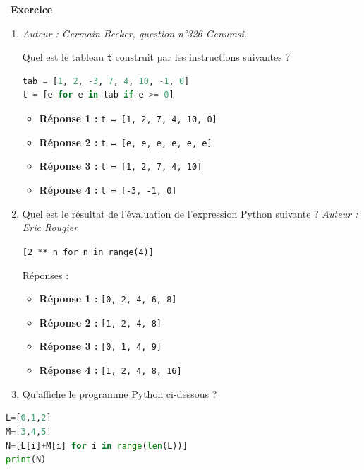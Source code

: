\documentclass[
  11pt,
]{article}
\newcommand{\passthrough}[1]{#1}
\providecommand{\tightlist}{%
  \setlength{\itemsep}{0pt}\setlength{\parskip}{0pt}}
\newcounter{exo}
\newenvironment{exercice}[1]
{\par \medskip   \addtocounter{exo}{1} \noindent  
\begin{bclogo}[arrondi =0.1,   noborder = true, logo=\bccrayon, marge=4]{~\textbf{Exercice} \textbf{\theexo} {\itshape #1} }  \par}
{
\end{bclogo}
 \par \bigskip }
\newcounter{def}
\newcounter{prog}
\begin{document}
\begin{exercice}{}

\begin{enumerate}
\def\labelenumi{\arabic{enumi}.}
\item
  \emph{Auteur : Germain Becker, question n°326 Genumsi}.

  Quel est le tableau \passthrough{\lstinline!t!} construit par les
  instructions suivantes ?

\begin{lstlisting}[language=Python]
tab = [1, 2, -3, 7, 4, 10, -1, 0]
t = [e for e in tab if e >= 0]
\end{lstlisting}

  \begin{itemize}
  \tightlist
  \item
    \textbf{Réponse 1 :}
    \passthrough{\lstinline!t = [1, 2, 7, 4, 10, 0]!}
  \item
    \textbf{Réponse 2 :}
    \passthrough{\lstinline!t = [e, e, e, e, e, e]!}
  \item
    \textbf{Réponse 3 :} \passthrough{\lstinline!t = [1, 2, 7, 4, 10]!}
  \item
    \textbf{Réponse 4 :} \passthrough{\lstinline!t = [-3, -1, 0]!}
  \end{itemize}
\item
  Quel est le résultat de l'évaluation de l'expression Python suivante ?
  \emph{Auteur : Eric Rougier}

  \passthrough{\lstinline![2 ** n for n in range(4)]!}

  Réponses :

  \begin{itemize}
  \tightlist
  \item
    \textbf{Réponse 1 :} \passthrough{\lstinline![0, 2, 4, 6, 8]!}
  \item
    \textbf{Réponse 2 :} \passthrough{\lstinline![1, 2, 4, 8]!}
  \item
    \textbf{Réponse 3 :} \passthrough{\lstinline![0, 1, 4, 9]!}
  \item
    \textbf{Réponse 4 :} \passthrough{\lstinline![1, 2, 4, 8, 16]!}
  \end{itemize}
\item
  Qu'affiche le programme
  \href{https://docs.python.org/3/tutorial/datastructures.html}{Python}
  ci-dessous ?
\end{enumerate}

\begin{lstlisting}[language=Python]
L=[0,1,2]
M=[3,4,5]
N=[L[i]+M[i] for i in range(len(L))]
print(N)
\end{lstlisting}


\end{exercice}
\end{document}
